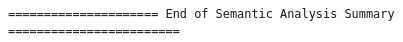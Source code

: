 \begin{lstlisting}[frame=single, gobble=0, caption={POGS report for PCA Pump prototype}]
===================== End of Semantic Analysis Summary ========================

\end{lstlisting}
\label{listing:pca_ravenscar:pogs_full}
\doublespacing